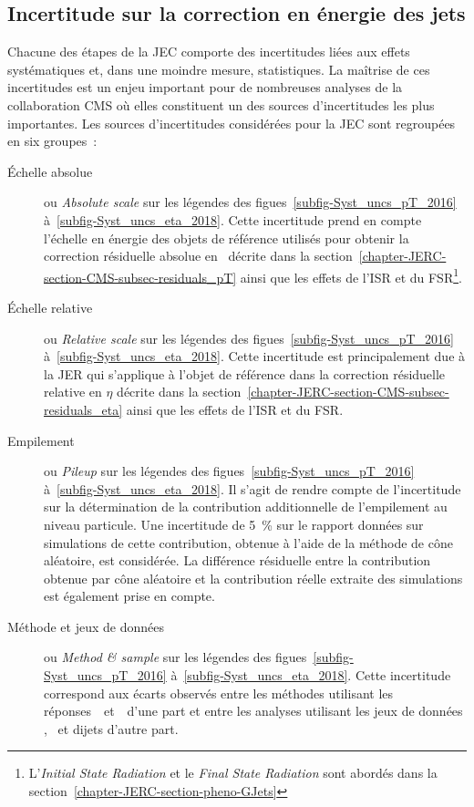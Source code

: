 \subsection{Incertitude sur la correction en énergie des jets}\label{chapter-JERC-section-CMS-subsec-unc}
Chacune des étapes de la JEC comporte des incertitudes liées aux effets systématiques et, dans une moindre mesure, statistiques.
La maîtrise de ces incertitudes est un enjeu important pour de nombreuses analyses de la collaboration CMS où elles constituent un des sources d'incertitudes les plus importantes.
Les sources d'incertitudes considérées pour la JEC sont regroupées en six groupes~\cite{CMS-DP-2020-019}:
\begin{description}
\item[Échelle absolue] ou \emph{Absolute scale} sur les légendes des figues~\ref{subfig-Syst_uncs_pT_2016} à~\ref{subfig-Syst_uncs_eta_2018}.
Cette incertitude prend en compte l'échelle en énergie des objets de référence utilisés pour obtenir la correction résiduelle absolue en \pT\ décrite dans la section~\ref{chapter-JERC-section-CMS-subsec-residuals_pT} ainsi que les effets de l'ISR et du FSR\footnote{L'\emph{Initial State Radiation} et le \emph{Final State Radiation} sont abordés dans la section~\ref{chapter-JERC-section-pheno-GJets}}.
\item[Échelle relative] ou \emph{Relative scale} sur les légendes des figues~\ref{subfig-Syst_uncs_pT_2016} à~\ref{subfig-Syst_uncs_eta_2018}.
Cette incertitude est principalement due à la JER qui s'applique à l'objet de référence dans la correction résiduelle relative en $\eta$ décrite dans la section~\ref{chapter-JERC-section-CMS-subsec-residuals_eta} ainsi que les effets de l'ISR et du FSR.
\item[Empilement] ou \emph{Pileup} sur les légendes des figues~\ref{subfig-Syst_uncs_pT_2016} à~\ref{subfig-Syst_uncs_eta_2018}.
Il s'agit de rendre compte de l'incertitude sur la détermination de la contribution additionnelle de l'empilement au niveau particule.
Une incertitude de \SI{5}{\%} sur le rapport données sur simulations de cette contribution, obtenue à l'aide de la méthode de cône aléatoire, est considérée.
La différence résiduelle entre la contribution obtenue par cône aléatoire et la contribution réelle extraite des simulations est également prise en compte.
\item[Méthode et jeux de données] ou \emph{Method \& sample} sur les légendes des figues~\ref{subfig-Syst_uncs_pT_2016} à~\ref{subfig-Syst_uncs_eta_2018}.
Cette incertitude correspond aux écarts observés entre les méthodes utilisant les réponses~\Rbal\ et~\RMPF\ d'une part et entre les analyses utilisant les jeux de données \Zjet, \Gjet\ et dijets d'autre part.

\end{description}
